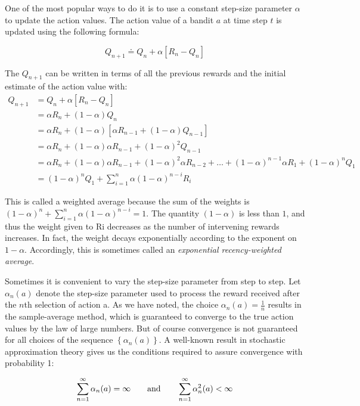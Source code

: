 One of the most popular ways to do it is to use a constant step-size parameter $\alpha$ to update the action values. The action value of a bandit $a$ at time step $t$ is updated using the following formula:

\begin{equation}
    Q_{n+1} \doteq Q_n + \alpha[R_n - Q_n]
\end{equation}

The $Q_{n+1}$ can be written in terms of all the previous rewards and the initial estimate of the action value with:
\begin{align*}
    Q_{n+1} &= Q_n + \alpha[R_n - Q_n] \\
    &= \alpha R_n + (1-\alpha)Q_n \\
    &= \alpha R_n + (1-\alpha)[\alpha R_{n-1} + (1-\alpha)Q_{n-1}] \\
    &= \alpha R_n + (1-\alpha)\alpha R_{n-1} + (1-\alpha)^2 Q_{n-1} \\
    &= \alpha R_n + (1-\alpha)\alpha R_{n-1} + (1-\alpha)^2\alpha R_{n-2} + \dots + (1-\alpha)^{n-1}\alpha R_1 + (1-\alpha)^nQ_1 \\
    &= (1-\alpha)^nQ_1 + \sum_{i=1}^{n}\alpha(1-\alpha)^{n-i}R_i
\end{align*}

This is called a weighted average because the sum of the weights is $(1-\alpha)^n+\sum_{i=1}^{n}\alpha(1-\alpha)^{n-i}=1$. The quantity $(1-\alpha)$ is less than $1$, and thus the weight given to Ri decreases as the number of intervening rewards increases. In fact, the weight decays exponentially according to the exponent on $1-\alpha$. Accordingly, this is sometimes called an \textit{exponential recency-weighted average}.

Sometimes it is convenient to vary the step-size parameter from step to step. Let $\alpha_n(a)$ denote the step-size parameter used to process the reward received after the $n$th selection of action a. As we have noted, the choice $\alpha_n(a) = \frac{1}{n}$ results in the sample-average method, which is guaranteed to converge to the true action values by the law of large numbers. But of course convergence is not guaranteed for all choices of the sequence $\left\{\alpha_n(a)\right\}$. A well-known result in stochastic approximation theory gives us the conditions required to assure convergence with probability 1:

\begin{equation}
    \sum_{n=1}^{\infty}\alpha_n(a) = \infty \quad\quad \text{and} \quad\quad \sum_{n=1}^{\infty}\alpha_n^2(a) < \infty\\
\end{equation}

